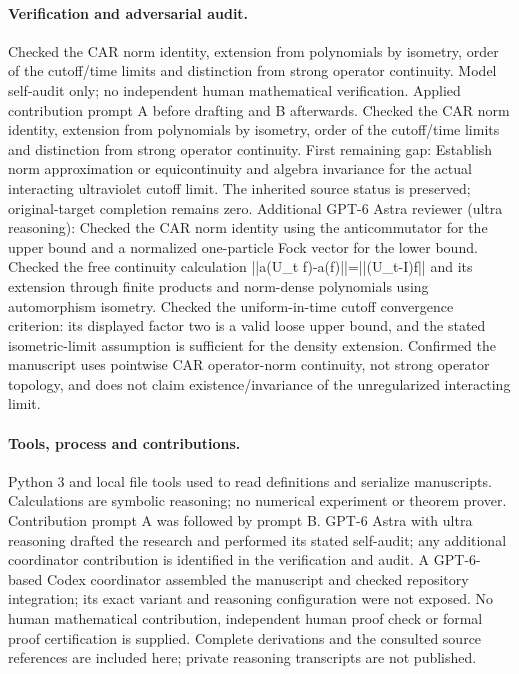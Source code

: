 \documentclass[11pt]{article}
\begin{document}
\paragraph{Verification and adversarial audit.}
Checked the CAR norm identity, extension from polynomials by isometry, order of the cutoff/time limits and distinction from strong operator continuity. Model self-audit only; no independent human mathematical verification. Applied contribution prompt A before drafting and B afterwards. Checked the CAR norm identity, extension from polynomials by isometry, order of the cutoff/time limits and distinction from strong operator continuity. First remaining gap: Establish norm approximation or equicontinuity and algebra invariance for the actual interacting ultraviolet cutoff limit. The inherited source status is preserved; original-target completion remains zero. Additional GPT-6 Astra reviewer (ultra reasoning): Checked the CAR norm identity using the anticommutator for the upper bound and a normalized one-particle Fock vector for the lower bound. Checked the free continuity calculation ||a(U\_t f)-a(f)||=||(U\_t-I)f|| and its extension through finite products and norm-dense polynomials using automorphism isometry. Checked the uniform-in-time cutoff convergence criterion: its displayed factor two is a valid loose upper bound, and the stated isometric-limit assumption is sufficient for the density extension. Confirmed the manuscript uses pointwise CAR operator-norm continuity, not strong operator topology, and does not claim existence/invariance of the unregularized interacting limit.

\paragraph{Tools, process and contributions.}
Python 3 and local file tools used to read definitions and serialize manuscripts. Calculations are symbolic reasoning; no numerical experiment or theorem prover. Contribution prompt A was followed by prompt B. GPT-6 Astra with ultra reasoning drafted the research and performed its stated self-audit; any additional coordinator contribution is identified in the verification and audit. A GPT-6-based Codex coordinator assembled the manuscript and checked repository integration; its exact variant and reasoning configuration were not exposed. No human mathematical contribution, independent human proof check or formal proof certification is supplied. Complete derivations and the consulted source references are included here; private reasoning transcripts are not published.
\end{document}
